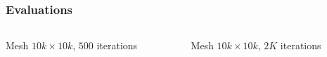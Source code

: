 \documentclass{beamer}
\begin{document}
\begin{frame}
\frametitle{Evaluations}
\begin{columns}
\begin{column}{.5\textwidth}
\begin{center}
\small Mesh $10k \times 10k$, $500$ iterations\\
\end{center}
\end{column}
\begin{column}{.5\textwidth}
\begin{center}
\small Mesh $10k \times 10k$, $2K$ iterations\\
\end{center}
\end{column}
\end{columns}
\end{frame}
\end{document}
